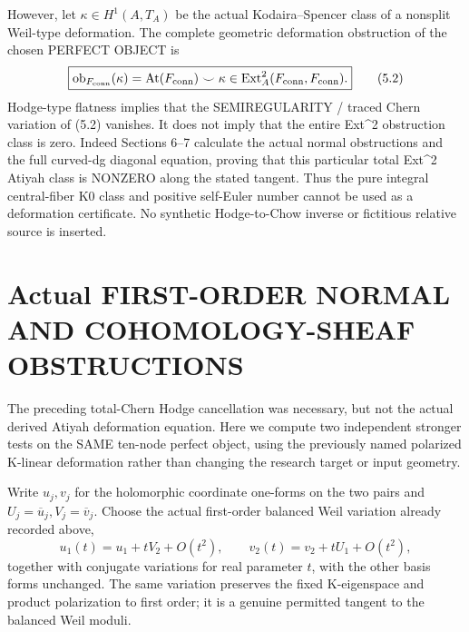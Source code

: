 \documentclass[11pt,a4paper]{article}
\newcommand{\Ext}{\operatorname{Ext}}
\begin{document}
However, let \(\kappa\in H^1(A,T_A)\)
be the actual Kodaira--Spencer class of
a nonsplit Weil-type deformation.
The complete geometric deformation
obstruction of the chosen PERFECT OBJECT is
\[
 \boxed{
 \operatorname{ob}_{F_{\rm conn}}(\kappa)
   =\operatorname{At}(F_{\rm conn})
          \smile\kappa
   \in\Ext_A^2(F_{\rm conn},F_{\rm conn}).}          \tag{5.2}
\]
Hodge-type flatness implies that the
SEMIREGULARITY / traced Chern variation
of (5.2) vanishes. It does not imply
that the entire Ext^2 obstruction
class is zero. Indeed Sections 6--7
calculate the actual normal
obstructions and the full curved-dg
diagonal equation, proving that this
particular total Ext^2 Atiyah class
is NONZERO along the stated tangent.
Thus the pure integral central-fiber
K0 class and positive self-Euler
number cannot be used as a deformation
certificate. No synthetic Hodge-to-Chow
inverse or fictitious relative source
is inserted.

\section{Actual FIRST-ORDER NORMAL AND COHOMOLOGY-SHEAF OBSTRUCTIONS}
The preceding total-Chern Hodge cancellation was
necessary, but not the actual derived Atiyah
deformation equation. Here we compute two
independent stronger tests on the SAME ten-node
perfect object, using the previously named
polarized K-linear deformation rather than
changing the research target or input geometry.

Write \(u_j,v_j\) for the holomorphic
coordinate one-forms on the two pairs and
\(U_j=\overline u_j,V_j=\overline v_j\).
Choose the actual first-order balanced
Weil variation already recorded above,
\[
 u_1(t)=u_1+tV_2+O(t^2),\qquad
 v_2(t)=v_2+tU_1+O(t^2),
                                                               \tag{6.1}
\]
together with conjugate variations for
real parameter \(t\), with the other
basis forms unchanged.
The same variation preserves the
fixed K-eigenspace and product
polarization to first order;
it is a genuine permitted tangent
to the balanced Weil moduli.
\end{document}
